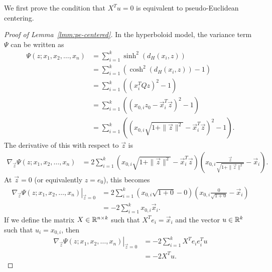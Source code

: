We first prove the condition that $X^T u = 0$ is equivalent to pseudo-Euclidean
centering.

\begin{proof}[Proof of Lemma~\ref{lmm:pe-centered}]
In the hyperboloid model, the variance term $\Psi$ can be written as
\begin{align*}
  \Psi(z; x_1, x_2, \ldots, x_n)
  &=
  \sum_{i=1}^k \sinh^2(d_H(x_i, z)) \\
  &=
  \sum_{i=1}^k \left( \cosh^2(d_H(x_i, z)) - 1 \right) \\
  &=
  \sum_{i=1}^k \left( (x_i^T Q z)^2 - 1 \right) \\
  &=
  \sum_{i=1}^k \left( (x_{0,i} z_0 - \vec{x}_i^T \vec{z})^2 - 1 \right) \\
  &=
  \sum_{i=1}^k \left( \left(x_{0,i} \sqrt{ 1 + \| \vec{z} \|^2 } - \vec{x}_i^T \vec{z} \right)^2 - 1 \right).
\end{align*}
The derivative of this with respect to $\vec{z}$ is
\begin{align*}
  \nabla_{\vec{z}} \Psi(z; x_1, x_2, \ldots, x_n)
  &=
  2 \sum_{i=1}^k 
  \left(x_{0,i} \sqrt{ 1 + \| \vec{z} \|^2 } - \vec{x}_i^T \vec{z} \right)
  \left(x_{0,i} \frac{\vec{z}}{\sqrt{ 1 + \| \vec{z} \|^2 }} - \vec{x}_i \right).
\end{align*}
At $\vec{z} = 0$ (or equivalently $z = e_0$), this becomes
\begin{align*}
  \left. \nabla_{\vec{z}} \Psi(z; x_1, x_2, \ldots, x_n) \right|_{\vec{z} = 0}
  &=
  2 \sum_{i=1}^k 
  \left(x_{0,i} \sqrt{ 1 + 0 } - 0 \right)
  \left(x_{0,i} \frac{0}{\sqrt{ 1 + 0 }} - \vec{x}_i \right) \\
  &=
  -2 \sum_{i=1}^k x_{0,i} \vec{x}_i.
\end{align*}
If we define the matrix $X \in \mathbb{R}^{n \times k}$ such that $X^T e_i = \vec{x}_i$ and the vector $u \in \mathbb{R}^k$ such that $u_i = x_{0,i}$, then
\begin{align*}
  \left. \nabla_{\vec{z}} \Psi(z; x_1, x_2, \ldots, x_n) \right|_{\vec{z} = 0}
  &=
  -2 \sum_{i=1}^k X^T e_i e_i^T u \\
  &=
  -2 X^T u.
\end{align*}
\end{proof}


